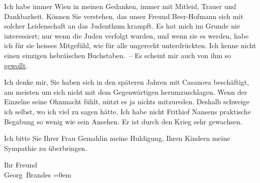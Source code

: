 \pstart
           Ich habe immer Wien in meinen Gedanken, immer mit
               Mitleid, Trauer und Dankbarkeit. Können Sie verstehen, das unser Freund Beer-Hofmann sich {\pb}mit solcher Leidenschaft an das
               Judenthum krampft. Es hat mich im Grunde nie interessiert; nur wenn die Juden
               verfolgt wurden, und wenn sie es werden, habe ich für sie heisses Mitgefühl, wie für
               alle ungerecht unterdrückten. Ich kenne nicht einen einzigen hebräischen
               Buchstaben. – Es scheint mir auch von ihm so \uline{gewollt}.\pend
           
\pstart
           Ich denke mir, Sie haben sich in den späteren Jahren mit Casanova beschäftigt, am meisten um sich nicht mit dem
               Gegenwärtigen herumzuschlagen. Wenn der Einzelne seine Ohnmacht fühlt, nützt es ja
               nichts mitzureden. Deshalb schweige ich selbst, wo ich viel zu sagen hätte. Ich habe
               nicht Frithiof Nansens praktische Begabung so
               wenig wie sein Ansehen. Er ist durch den Krieg sehr gewachsen.\pend
           
\pstart
           Ich bitte Sie Ihrer Frau Gemahlin meine Huldigung, Ihren Kindern meine Sympathie zu überbringen.\pend
           
\pstart
           Ihr Freund{\\[\baselineskip]}\spacefill\mbox{Georg Brandes}\pend
           \leftskip=0em{}\endnumbering{}  
      